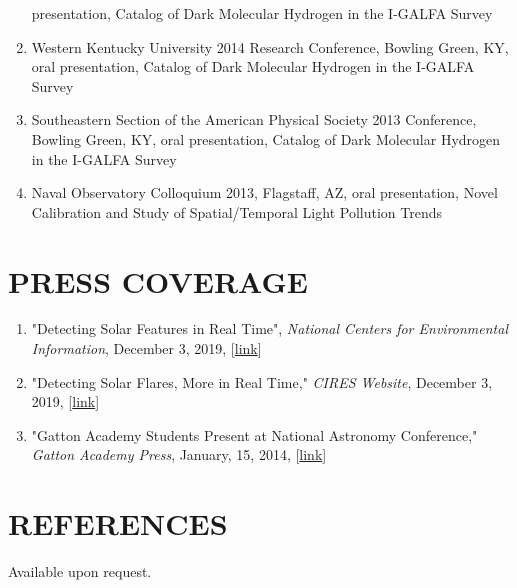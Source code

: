 \documentclass[line,margin]{res}
\begin{document}
\begin{resume}
\begin{enumerate}[leftmargin=*]
    presentation, Catalog of Dark Molecular Hydrogen in the I-GALFA Survey
    \item Western Kentucky University 2014 Research Conference, Bowling Green, KY, oral
    presentation, Catalog of Dark Molecular Hydrogen in the I-GALFA Survey
    \item Southeastern Section of the American Physical Society 2013 Conference, Bowling
    Green, KY, oral presentation, Catalog of Dark Molecular Hydrogen in the I-GALFA Survey
    \item Naval Observatory Colloquium 2013, Flagstaff, AZ, oral presentation, Novel Calibration
      and Study of Spatial/Temporal Light Pollution Trends
    \end{enumerate}
    
    \section{PRESS COVERAGE}
  \begin{enumerate}[leftmargin=*]
  \item "Detecting Solar Features in Real Time", \textit{National Centers for Environmental Information}, December 3, 2019, [\href{https://www.ncei.noaa.gov/news/solar-classification}{link}]
  \item "Detecting Solar Flares, More in Real Time," \textit{CIRES Website}, December 3, 2019, [\href{https://cires.colorado.edu/news/detecting-solar-flares-more-real-time}{link}]
  \item "Gatton Academy Students Present at National Astronomy Conference," \textit{Gatton Academy Press}, January, 15, 2014, [\href{http://www.fightingautomatons.com/news/2014/01/gatton-academy-students-present-at-national-astronomy-conference/}{link}]
  \end{enumerate}
  \section{REFERENCES}
  Available upon request.
                
\end{resume}
\end{document}
